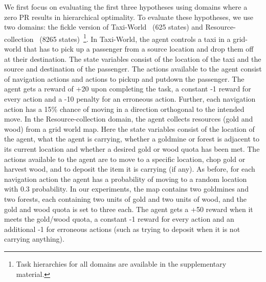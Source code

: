 We first focus on evaluating the first three hypotheses using domains
where a zero PR results in hierarchical optimality. To
evaluate these hypotheses, we use two domains: the fickle version of
{\sf Taxi-World}~\cite{d-hrl-00} (625 states) and {\sf
Resource-collection}~\cite{mehta.icml08} (8265 states)~\footnote{Task hierarchies for all domains are available in the supplementary material.}. In {\sf
Taxi-World}, the agent controls a taxi in a grid-world that has to
pick up a passenger from a source location and drop them off at their
destination. The state variables consist of the location of the taxi
and the source and destination of the passenger. The actions available
to the agent consist of navigation actions and actions to pickup and
putdown the passenger.  The agent gets a reward of +20 upon completing
the task, a constant -1 reward for every action and a -10 penalty for
an erroneous action. Further, each navigation action has a 15\% chance
of moving in a direction orthogonal to the intended move. In the {\sf
Resource-collection} domain, the agent collects resources (gold and
wood) from a grid world map. Here the state
variables consist of the location of the agent, what the agent is
carrying, whether a goldmine or forest is adjacent to its current
location and whether a desired gold or wood quota has been met. The
actions available to the agent are to move to a specific location,
chop gold or harvest wood, and to deposit the item it is carrying (if
any).
As before, for each navigation action the agent has a
probability of moving to a random location with 0.3 probability. 
In our experiments, the map contains two
goldmines and two forests, each containing two units of gold and two
units of wood, and the gold and wood quota is set to three each. The
agent gets a +50 reward when it meets the gold/wood quota, a constant
-1 reward for every action and an additional -1 for erroneous actions
(such as trying to deposit when it is not carrying anything).

